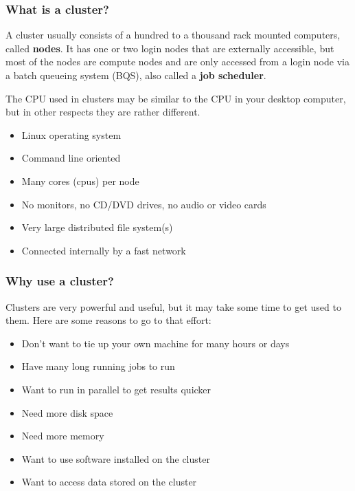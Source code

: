 \documentclass[10pt]{beamer}
\begin{document}
\begin{frame}
\frametitle{What is a cluster?}

A cluster usually consists of a hundred to a thousand rack mounted
computers, called \textbf{nodes}.  It has one or two login nodes
that are externally accessible, but most of the nodes are
compute nodes and are only accessed from a login node via a
batch queueing system (BQS), also called a \textbf{job scheduler}.

\vskip10pt
The CPU used in clusters may be similar to the CPU in your
desktop computer, but in other respects they are rather different.

\begin{itemize}
\item Linux operating system
\item Command line oriented 
\item Many cores (cpus) per node
\item No monitors, no CD/DVD drives, no audio or video cards
\item Very large distributed file system(s)
\item Connected internally by a fast network
\end{itemize}
\end{frame}

\begin{frame}
\frametitle{Why use a cluster?}
Clusters are very powerful and useful, but it may take some
time to get used to them.
Here are some reasons to go to that effort:

\begin{itemize}
\item Don't want to tie up your own machine for many hours or days
\item Have many long running jobs to run
\item Want to run in parallel to get results quicker
\item Need more disk space
\item Need more memory
\item Want to use software installed on the cluster
\item Want to access data stored on the cluster
\end{itemize}
\end{frame}
\end{document}
